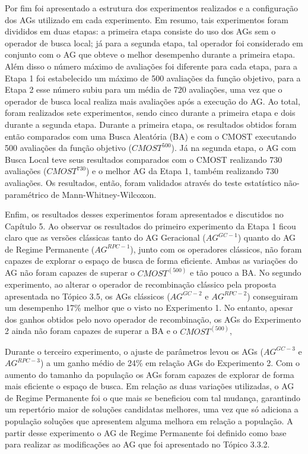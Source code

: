 Por fim foi apresentado a estrutura dos experimentos realizados e a configuração dos AGs utilizado em cada experimento. Em resumo, tais experimentos foram divididos em duas etapas: a primeira etapa consiste do uso dos AGs sem o operador de busca local; já para a segunda etapa, tal operador foi considerado em conjunto com o AG que obteve o melhor desempenho durante a primeira etapa. Além disso o número máximo de avaliações foi diferente para cada etapa, para a Etapa 1 foi estabelecido um máximo de 500 avaliações da função objetivo, para a Etapa 2 esse número subiu para um média de 720 avaliações, uma vez que o operador de busca local realiza mais avaliações após a execução do AG. Ao total, foram realizados sete experimentos, sendo cinco durante a primeira etapa e dois durante a segunda etapa. Durante a primeira etapa, os resultados obtidos foram então comparados com uma Busca Aleatória (BA) e com o CMOST executando 500 avaliações da função objetivo ($CMOST^{500}$). Já na segunda etapa, o AG com Busca Local teve seus resultados comparados com o CMOST realizando 730 avaliações ($CMOST^{730}$) e o melhor AG da Etapa 1, também realizando 730 avaliações. Os resultados, então, foram validados através do teste estatístico não-paramétrico de Mann-Whitney-Wilcoxon. 

Enfim, os resultados desses experimentos foram apresentados e discutidos no Capítulo 5. Ao observar os resultados do primeiro experimento da Etapa 1 ficou claro que as versões clássicas tanto do AG Geracional ($AG^{GC-1}$) quanto do AG de Regime Permanente ($AG^{RPC-1}$), junto com os operadores clássicos, não foram capazes de explorar o espaço de busca de forma eficiente.  Ambas as variações do AG não foram capazes de superar o $CMOST^(500)$ e tão pouco a BA. No segundo experimento, ao alterar o operador de recombinação clássico pela proposta apresentada no Tópico 3.5, os AGs clássicos ($AG^{GC-2}$ e $AG^{RPC-2}$) conseguiram um desempenho 17\% melhor que o visto no Experimento 1. No entanto, apesar dos ganhos obtidos pelo novo operador de recombinação, os AGs do Experimento 2 ainda não foram capazes de superar a BA e o $CMOST^(500)$, 

Durante o terceiro experimento, o ajuste de parâmetros levou os AGs ($AG^{GC-3}$ e $AG^{RPC-3}$) a um ganho médio de 24\% em relação AGs do Experimento 2. Com o aumento do tamanho da população os AGs foram capazes de explorar de forma mais eficiente o espaço de busca. Em relação as duas variações utilizadas, o AG de Regime Permanente foi o que mais se beneficiou com tal mudança, garantindo um repertório maior de soluções candidatas melhores, uma vez que só adiciona a população soluções que apresentem alguma melhora em relação a população. A partir desse experimento o AG de Regime Permanente foi definido como base para realizar as modificações ao AG que foi apresentado no Tópico 3.3.2. 

